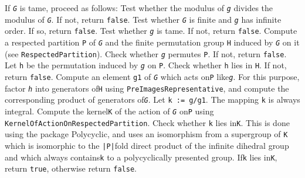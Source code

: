 \documentclass[a4paper,11pt]{report}
\begin{document}
{\begin{description}
 If \mbox{\texttt{\mdseries\slshape G}} is tame, proceed as follows: Test whether the modulus of \mbox{\texttt{\mdseries\slshape g}} divides the modulus of \mbox{\texttt{\mdseries\slshape G}}. If not, return \texttt{false}. Test whether \mbox{\texttt{\mdseries\slshape G}} is finite and \mbox{\texttt{\mdseries\slshape g}} has infinite order. If so, return \texttt{false}. Test whether \mbox{\texttt{\mdseries\slshape g}} is tame. If not, return \texttt{false}. Compute a respected partition \texttt{P} of \mbox{\texttt{\mdseries\slshape G}} and the finite permutation group \texttt{H} induced by \mbox{\texttt{\mdseries\slshape G}} on it (see \texttt{RespectedPartition}). Check whether \mbox{\texttt{\mdseries\slshape g}} permutes \texttt{P}. If not, return \texttt{false}. Let \texttt{h} be the permutation induced by \mbox{\texttt{\mdseries\slshape g}} on \texttt{P}. Check whether \texttt{h} lies in \texttt{H}. If not, return \texttt{false}. Compute an element \texttt{g1} of \mbox{\texttt{\mdseries\slshape G}} which acts on{\nobreakspace}\texttt{P} like{\nobreakspace}\mbox{\texttt{\mdseries\slshape g}}. For this purpose, factor \mbox{\texttt{\mdseries\slshape h}} into generators of{\nobreakspace}\texttt{H} using \texttt{PreImagesRepresentative}, and compute the corresponding product of generators of{\nobreakspace}\mbox{\texttt{\mdseries\slshape G}}. Let \texttt{k := g/g1}. The mapping \texttt{k} is always integral. Compute the kernel{\nobreakspace}\texttt{K} of the action of \mbox{\texttt{\mdseries\slshape G}} on{\nobreakspace}\texttt{P} using \texttt{KernelOfActionOnRespectedPartition}. Check whether \texttt{k} lies in{\nobreakspace}\texttt{K}. This is done using the package \textsf{Polycyclic}{\nobreakspace}\cite{Polycyclic}, and uses an isomorphism from a supergroup of {\nobreakspace}\texttt{K} which is isomorphic to the \texttt{|P|}\texttt{}fold direct product of the infinite dihedral group and
which always contains{\nobreakspace}\texttt{k} to a polycyclically presented group. If{\nobreakspace}\texttt{k} lies in{\nobreakspace}\texttt{K}, return \texttt{true}, otherwise return \texttt{false}. 


\end{description}}
\end{document}
